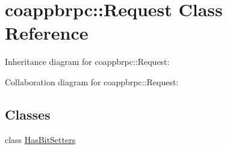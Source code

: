 \hypertarget{classcoappbrpc_1_1Request}{}\section{coappbrpc\+:\+:Request Class Reference}
\label{classcoappbrpc_1_1Request}


Inheritance diagram for coappbrpc\+:\+:Request\+:


Collaboration diagram for coappbrpc\+:\+:Request\+:
\subsection*{Classes}
\begin{DoxyCompactItemize}
\item 
class \hyperlink{classcoappbrpc_1_1Request_1_1HasBitSetters}{Has\+Bit\+Setters}
\end{DoxyCompactItemize}
